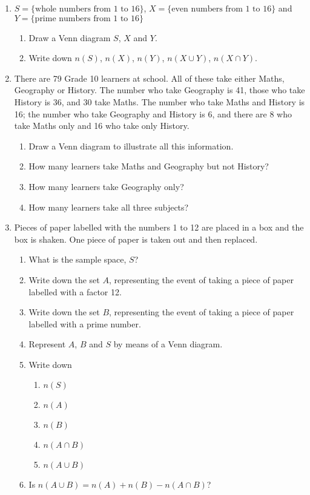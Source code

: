 \documentclass[10pt,a4paper,titlepage,twoside,openright]{report}
\begin{document}
{
\begin{enumerate}
\item $S=\{\mbox{whole numbers from 1 to 16}\}$,
$X=\{\mbox{even numbers from 1 to 16}\}$ and
$Y=\{\mbox{prime numbers from 1 to 16}\}$
    \begin{enumerate}
    \item Draw a Venn diagram $S$, $X$ and $Y$.
    \item Write down $n(S)$, $n(X)$, $n(Y)$, $n(X \cup Y)$, $n(X \cap Y)$.
    \end{enumerate}

\item There are 79 Grade 10 learners at school. All of these take either Maths, Geography or History. The number who take Geography is 41, those who take History is 36, and 30 take Maths. The number who take Maths and History is 16; the number who take Geography and History is 6, and there are 8 who take Maths only and 16 who take only History.
    \begin{enumerate}
    \item Draw a Venn diagram to illustrate all this information.
    \item How many learners take Maths and Geography but not History?
    \item How many learners take Geography only?
    \item How many learners take all three subjects?
    \end{enumerate}

\item Pieces of paper labelled with the numbers 1 to 12 are placed in a box and the box is shaken. One piece of paper is taken out and then replaced.
    \begin{enumerate}
    \item What is the sample space, $S$?
    \item Write down the set $A$, representing the event of taking a piece of paper labelled with a factor 12.
    \item Write down the set $B$, representing the event of taking a piece of paper labelled with a prime number.
    \item Represent $A$, $B$ and $S$ by means of a Venn diagram.
    \item Write down
        \begin{enumerate}
        \item $n(S)$
        \item $n(A)$
        \item $n(B)$
        \item $n(A \cap B)$
        \item $n(A \cup B)$
        \end{enumerate}
    \item Is $n(A \cup B) = n(A) + n(B) - n(A \cap B)$?
    \end{enumerate}
\end{enumerate}
}
\end{document}
